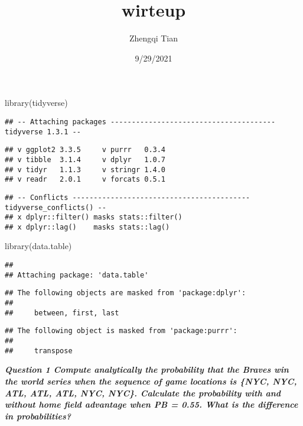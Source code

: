 \documentclass[
]{article}
\title{wirteup}
\author{Zhengqi Tian}
\date{9/29/2021}
\newenvironment{Shaded}{\begin{snugshade}}{\end{snugshade}}
\newcommand{\FunctionTok}[1]{\textcolor[rgb]{0.00,0.00,0.00}{#1}}
\newcommand{\NormalTok}[1]{#1}
\begin{document}
\maketitle

\begin{Shaded}
\begin{Highlighting}[]
\FunctionTok{library}\NormalTok{(tidyverse)}
\end{Highlighting}
\end{Shaded}

\begin{verbatim}
## -- Attaching packages --------------------------------------- tidyverse 1.3.1 --
\end{verbatim}

\begin{verbatim}
## v ggplot2 3.3.5     v purrr   0.3.4
## v tibble  3.1.4     v dplyr   1.0.7
## v tidyr   1.1.3     v stringr 1.4.0
## v readr   2.0.1     v forcats 0.5.1
\end{verbatim}

\begin{verbatim}
## -- Conflicts ------------------------------------------ tidyverse_conflicts() --
## x dplyr::filter() masks stats::filter()
## x dplyr::lag()    masks stats::lag()
\end{verbatim}

\begin{Shaded}
\begin{Highlighting}[]
\FunctionTok{library}\NormalTok{(data.table)}
\end{Highlighting}
\end{Shaded}

\begin{verbatim}
## 
## Attaching package: 'data.table'
\end{verbatim}

\begin{verbatim}
## The following objects are masked from 'package:dplyr':
## 
##     between, first, last
\end{verbatim}

\begin{verbatim}
## The following object is masked from 'package:purrr':
## 
##     transpose
\end{verbatim}

\textbf{\emph{Question 1 Compute analytically the probability that the
Braves win the world series when the sequence of game locations is
\{NYC, NYC, ATL, ATL, ATL, NYC, NYC\}. Calculate the probability with
and without home field advantage when PB = 0.55. What is the difference
in probabilities?}}
\end{document}
